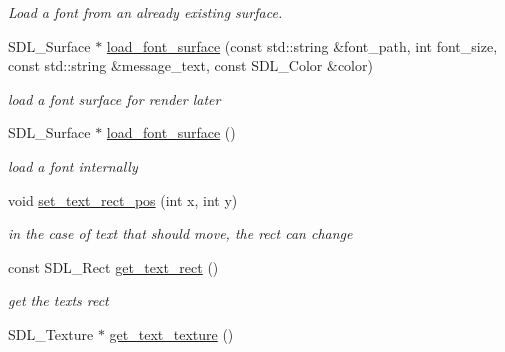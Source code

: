 \begin{DoxyCompactItemize}
\begin{DoxyCompactList}\small\item\em Load a font from an already existing surface. \end{DoxyCompactList}\item 
S\+D\+L\+\_\+\+Surface $\ast$ \hyperlink{classText_a48a35ad03203fe273d0a3db786174b30}{load\+\_\+font\+\_\+surface} (const std\+::string \&font\+\_\+path, int font\+\_\+size, const std\+::string \&message\+\_\+text, const S\+D\+L\+\_\+\+Color \&color)\hypertarget{classText_a48a35ad03203fe273d0a3db786174b30}{}\label{classText_a48a35ad03203fe273d0a3db786174b30}

\begin{DoxyCompactList}\small\item\em load a font surface for render later \end{DoxyCompactList}\item 
S\+D\+L\+\_\+\+Surface $\ast$ \hyperlink{classText_a37d945974232349f28cdca410b766197}{load\+\_\+font\+\_\+surface} ()\hypertarget{classText_a37d945974232349f28cdca410b766197}{}\label{classText_a37d945974232349f28cdca410b766197}

\begin{DoxyCompactList}\small\item\em load a font internally \end{DoxyCompactList}\item 
void \hyperlink{classText_a51e4d204b3ed3c44b4deef7b339121a4}{set\+\_\+text\+\_\+rect\+\_\+pos} (int x, int y)\hypertarget{classText_a51e4d204b3ed3c44b4deef7b339121a4}{}\label{classText_a51e4d204b3ed3c44b4deef7b339121a4}

\begin{DoxyCompactList}\small\item\em in the case of text that should move, the rect can change \end{DoxyCompactList}\item 
const S\+D\+L\+\_\+\+Rect \hyperlink{classText_ae86a06a3fbf68396c970c1721b282686}{get\+\_\+text\+\_\+rect} ()\hypertarget{classText_ae86a06a3fbf68396c970c1721b282686}{}\label{classText_ae86a06a3fbf68396c970c1721b282686}

\begin{DoxyCompactList}\small\item\em get the text\textquotesingle{}s rect \end{DoxyCompactList}\item 
S\+D\+L\+\_\+\+Texture $\ast$ \hyperlink{classText_a00fc212fa653487e732e7f1d220aec76}{get\+\_\+text\+\_\+texture} ()\hypertarget{classText_a00fc212fa653487e732e7f1d220aec76}{}\label{classText_a00fc212fa653487e732e7f1d220aec76}


\end{DoxyCompactItemize}
